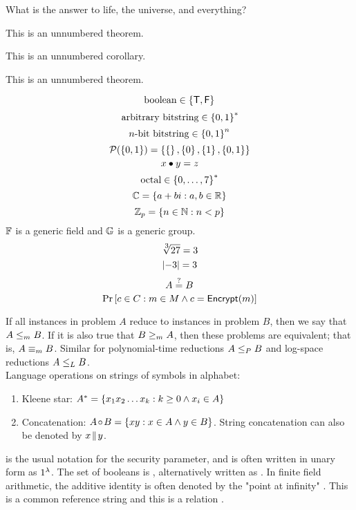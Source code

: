 \documentclass{article}
\begin{document}
\begin{problem}
    What is the answer to life, the universe, and everything?
\end{problem}
\begin{solution}
    \begin{theorem*}
        This is an unnumbered theorem.
    \end{theorem*}
    \begin{corollary*}
        This is an unnumbered corollary.
    \end{corollary*}
    \begin{lemma*}
        This is an unnumbered theorem.
    \end{lemma*}

    $$\str{boolean} \in \boolset$$
    $$\str{arbitrary bitstring} \in \bitsset$$
    $$n\str{-bit bitstring} \in \bitsset[n]$$
    $$\mathcal{P}(\left\{ 0,1 \right\}) = \left\{ \left\{  \right\}, \left\{ 0 \right\}, \left\{ 1 \right\}, \left\{ 0,1 \right\} \right\}$$
    $$x \bullet y = z$$
    $$\str{octal} \in \lset{0}{7}^*$$
    $$\mathbb{C} = \left\{ a + bi : a,b \in \mathbb{R} \right\}$$
    $$\mathbb{Z}_{p} = \left\{ n \in \mathbb{N} : n < p \right\}$$
    $\mathbb{F}$ is a generic field and $\mathbb{G}$ is a generic group.\\
    $$\nthroot{3}{27} = 3$$
    $$\left| -3 \right| = 3$$
    $$ A \overset{?}{=} B$$
    $$\Pr{[c \in C \given m \in M \land c = \alg{Encrypt}(m)]}$$

    If all instances in problem $A$ reduce to instances in problem $B$, then we say that $A \leq_m B$. If it is also true that $B \geq_m A$, then these problems are equivalent; that is, $A \equiv_m B$. Similar for polynomial-time reductions $A \leq_P B$ and log-space reductions $A \leq_L B$. \\

    Language operations on strings of symbols in alphabet:
    \begin{enumerate}
        \item Kleene star: ${A}^* = \left\{ x_1 x_2 \ldots x_k : k \geq 0 \land x_i \in A \right\}$
        \item Concatenation: $A \!\mathrel{\circ}\! B = \left\{ xy : x \in A \land y \in B \right\}$. String concatenation can also be denoted by $x \!\mathrel{\Vert}\! y$.
    \end{enumerate}

    \par \secparam is the usual notation for the security parameter, and is often written in unary form as $1^\lambda$. The set of booleans is \boolset, alternatively written as . In finite field arithmetic, the additive identity is often denoted by the "point at infinity" \inftypt. This is a common reference string \crs and this is a relation \rel{}.


\end{solution}
\end{document}
